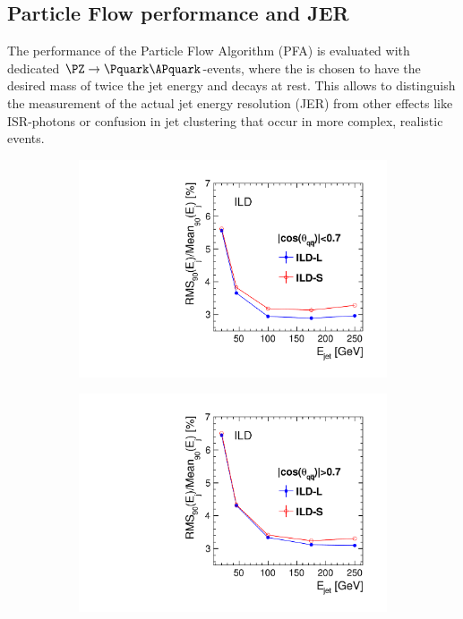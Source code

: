 \subsection{Particle Flow performance and JER}
The performance of the Particle Flow Algorithm (PFA) is evaluated with dedicated  $\PZ\rightarrow \Pquark\APquark$-events, where
the \PZ is chosen to have the desired mass of twice the jet energy and decays at rest. This allows to distinguish the measurement of the
actual jet energy resolution (JER) from other effects like ISR-photons or confusion in jet clustering that occur in more complex,
realistic events.
%
% 
\begin{figure}[htbp]
\begin{subfigure}{0.49\hsize}
 \includegraphics[width=\hsize]{Performance/fig/JERs_uds_l5_vs_s5_Barrel.pdf}
 \caption{ \label{fig:perf:pfa_jer}}
 \end{subfigure}
\begin{subfigure}{0.49\hsize}
 \includegraphics[width=\hsize]{Performance/fig/JERs_uds_l5_vs_s5_Endcap.pdf}

\end{subfigure}
\end{figure}
